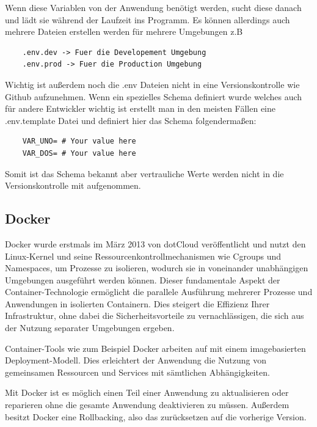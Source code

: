 Wenn diese Variablen von der Anwendung benötigt werden, sucht diese danach und lädt sie während der Laufzeit ins Programm. 
Es können allerdings auch mehrere Dateien erstellen werden für mehrere Umgebungen z.B
\begin{verbatim}
    .env.dev -> Fuer die Developement Umgebung
    .env.prod -> Fuer die Production Umgebung
\end{verbatim}

Wichtig ist außerdem noch die .env Dateien nicht in eine Versionskontrolle wie Github aufzunehmen. Wenn ein spezielles Schema definiert wurde welches auch für andere Entwickler wichtig ist erstellt man in den meisten Fällen eine .env.template Datei und definiert hier das Schema folgendermaßen:

\begin{verbatim}
    VAR_UNO= # Your value here
    VAR_DOS= # Your value here
\end{verbatim}

Somit ist das Schema bekannt aber vertrauliche Werte werden nicht in die Versionskontrolle mit aufgenommen.


\cite{Umgebungsvariablen}




\subsection{Docker}

Docker wurde erstmals im März 2013 von dotCloud veröffentlicht und nutzt den Linux-Kernel und seine Ressourcenkontrollmechanismen wie Cgroups und Namespaces, um Prozesse zu isolieren, wodurch sie in voneinander unabhängigen Umgebungen ausgeführt werden können. Dieser fundamentale Aspekt der Container-Technologie ermöglicht die parallele Ausführung mehrerer Prozesse und Anwendungen in isolierten Containern. Dies steigert die Effizienz Ihrer Infrastruktur, ohne dabei die Sicherheitsvorteile zu vernachlässigen, die sich aus der Nutzung separater Umgebungen ergeben.

Container-Tools wie zum Beispiel Docker arbeiten auf mit einem imagebasierten Deployment-Modell. Dies erleichtert der Anwendung die Nutzung von gemeinsamen Ressourcen und Services mit sämtlichen Abhängigkeiten.

Mit Docker ist es möglich einen Teil einer Anwendung zu aktualisieren oder reparieren ohne die gesamte Anwendung deaktivieren zu müssen. Außerdem besitzt Docker eine Rollbacking, also das zurücksetzen auf die vorherige Version.

\cite{Vorteile_Nachteile_Docker}
\cite{Was_ist_Docker}




